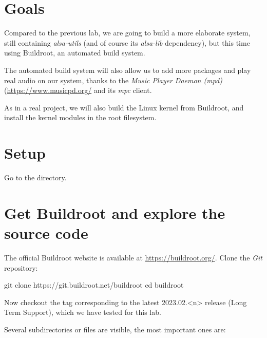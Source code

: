 
\section{Goals}

Compared to the previous lab, we are going to build a more elaborate
system, still containing {\em alsa-utils} (and of course its {\em
alsa-lib} dependency), but this time using Buildroot,
an automated build system.

The automated build system will also allow us to add more packages
and play real audio on our system, thanks to the {\em Music Player
Daemon (mpd)} (\url{https://www.musicpd.org/} and its {\em mpc} client.

As in a real project, we will also build the Linux kernel from
Buildroot, and install the kernel modules in the root filesystem.

\section{Setup}

Go to the  directory.

\section{Get Buildroot and explore the source code}

The official Buildroot website is available at
\url{https://buildroot.org/}. Clone the {\em Git} repository:

\begin{bashinput}
git clone https://git.buildroot.net/buildroot
cd buildroot
\end{bashinput}

Now checkout the tag corresponding to the latest 2023.02.<n> release (Long
Term Support), which we have tested for this lab.

Several subdirectories or files are visible, the most important ones
are:

